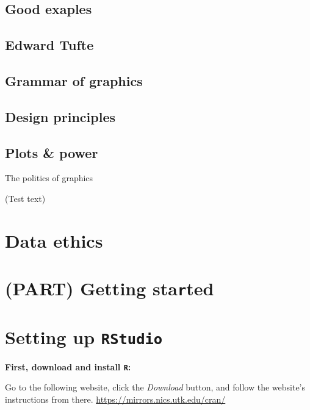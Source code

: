 \documentclass[
]{book}
\begin{document}
\hypertarget{good-exaples}{%
\section{Good exaples}\label{good-exaples}}

\hypertarget{edward-tufte}{%
\section{Edward Tufte}\label{edward-tufte}}

\hypertarget{grammar-of-graphics}{%
\section{Grammar of graphics}\label{grammar-of-graphics}}

\hypertarget{design-principles}{%
\section{Design principles}\label{design-principles}}

\hypertarget{plots-power}{%
\section{Plots \& power}\label{plots-power}}

The politics of graphics

(Test text)

\hypertarget{data-ethics}{%
\chapter{Data ethics}\label{data-ethics}}

\hypertarget{part-getting-started}{%
\chapter*{\texorpdfstring{(PART) Getting sta\texttt{r}ted}{(PART) Getting started}}\label{part-getting-started}}

\hypertarget{setting-up-rstudio}{%
\chapter{\texorpdfstring{Setting up \texttt{RStudio}}{Setting up RStudio}}\label{setting-up-rstudio}}

\textbf{First, download and install \texttt{R}: }

Go to the following website, click the \emph{Download} button, and follow the website's instructions from there.
\url{https://mirrors.nics.utk.edu/cran/}
\end{document}
